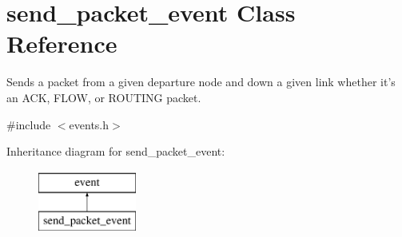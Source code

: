 \hypertarget{classsend__packet__event}{\section{send\-\_\-packet\-\_\-event Class Reference}
\label{classsend__packet__event}
}


Sends a packet from a given departure node and down a given link whether it's an A\-C\-K, F\-L\-O\-W, or R\-O\-U\-T\-I\-N\-G packet.  




{\ttfamily \#include $<$events.\-h$>$}

Inheritance diagram for send\-\_\-packet\-\_\-event\-:\begin{figure}[H]
\begin{center}
\leavevmode
\includegraphics[height=2.000000cm]{classsend__packet__event}
\end{center}
\end{figure}
